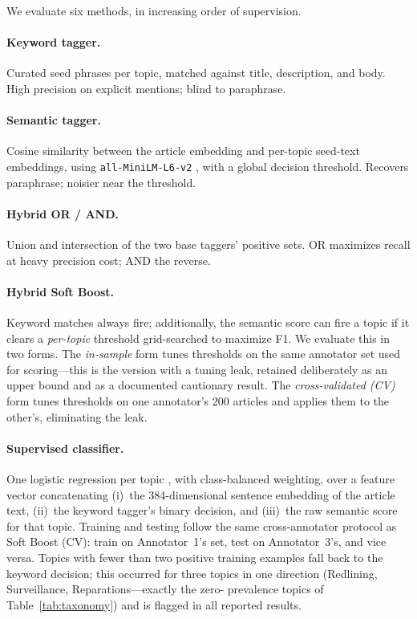 \documentclass[letterpaper,twocolumn,10pt]{article}
\begin{document}
We evaluate six methods, in increasing order of supervision.

\paragraph{Keyword tagger.}
Curated seed phrases per topic, matched against title, description, and
body. High precision on explicit mentions; blind to paraphrase.

\paragraph{Semantic tagger.}
Cosine similarity between the article embedding and per-topic seed-text
embeddings, using \texttt{all-MiniLM-L6-v2} \cite{reimers2019}, with a
global decision threshold. Recovers paraphrase; noisier near the
threshold.

\paragraph{Hybrid OR / AND.}
Union and intersection of the two base taggers' positive sets. OR
maximizes recall at heavy precision cost; AND the reverse.

\paragraph{Hybrid Soft Boost.}
Keyword matches always fire; additionally, the semantic score can fire a
topic if it clears a \emph{per-topic} threshold grid-searched to maximize
F1. We evaluate this in two forms. The \emph{in-sample} form tunes
thresholds on the same annotator set used for scoring---this is the
version with a tuning leak, retained deliberately as an upper bound and
as a documented cautionary result. The \emph{cross-validated (CV)} form
tunes thresholds on one annotator's 200 articles and applies them to the
other's, eliminating the leak.

\paragraph{Supervised classifier.}
One logistic regression per topic \cite{pedregosa2011}, with
class-balanced weighting, over a feature vector concatenating (i)~the
384-dimensional sentence embedding of the article text, (ii)~the keyword
tagger's binary decision, and (iii)~the raw semantic score for that
topic. Training and testing follow the same cross-annotator protocol as
Soft Boost (CV): train on Annotator~1's set, test on Annotator~3's, and
vice versa. Topics with fewer than two positive training examples fall
back to the keyword decision; this occurred for three topics in one
direction (Redlining, Surveillance, Reparations---exactly the zero-
prevalence topics of Table~\ref{tab:taxonomy}) and is flagged in all
reported results.
\end{document}
